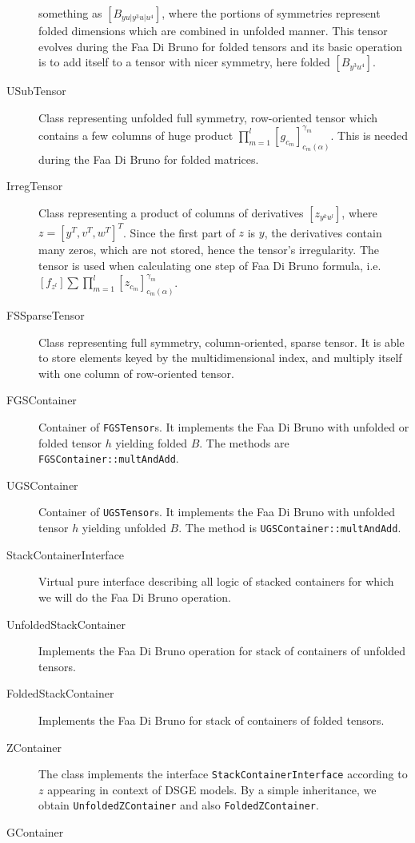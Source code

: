 \documentclass[11pt,a4paper]{article}
\begin{document}
\begin{description}
something as $\left[B_{yu\vert y^3u\vert u^4}\right]$, where the
portions of symmetries represent folded dimensions which are combined
in unfolded manner. This tensor evolves during the Faa Di Bruno
for folded tensors and its basic operation is to add itself to a
tensor with nicer symmetry, here folded $\left[B_{y^3u^4}\right]$.
\item[USubTensor] 
Class representing unfolded full symmetry, row-oriented tensor which
contains a few columns of huge product
$\prod_{m=1}^l\left[g_{c_m}\right]^{\gamma_m}_{c_m(\alpha)}$. This is
needed during the Faa Di Bruno for folded matrices.
\item[IrregTensor] 
Class representing a product of columns of derivatives
$\left[z_{y^ku^l}\right]$, where $z=[y^T,v^T,w^T]^T$. Since the first
part of $z$ is $y$, the derivatives contain many zeros, which are not
stored, hence the tensor's irregularity. The tensor is used when
calculating one step of Faa Di Bruno formula, i.e.
$\left[f_{z^l}\right]\sum\prod_{m=1}^l\left[z_{c_m}\right]^{\gamma_m}_{c_m(\alpha)}$.
\item[FSSparseTensor] 
Class representing full symmetry, column-oriented, sparse tensor. It
is able to store elements keyed by the multidimensional index, and
multiply itself with one column of row-oriented tensor.
\item[FGSContainer] 
Container of \texttt{FGSTensor}s. It implements the Faa Di Bruno with
unfolded or folded tensor $h$ yielding folded $B$. The methods are
\texttt{FGSContainer::multAndAdd}.
\item[UGSContainer] 
Container of \texttt{UGSTensor}s. It implements the Faa Di Bruno with
unfolded tensor $h$ yielding unfolded $B$. The method is
\texttt{UGSContainer::multAndAdd}.
\item[StackContainerInterface] 
Virtual pure interface describing all logic
of stacked containers for which we will do the Faa Di Bruno operation. 
\item[UnfoldedStackContainer] 
Implements the Faa Di Bruno operation for stack of
containers of unfolded tensors.
\item[FoldedStackContainer] 
Implements the Faa Di Bruno for stack of
containers of folded tensors.
\item[ZContainer] 
The class implements the interface \texttt{StackContainerInterface} according
to $z$ appearing in context of DSGE models. By a simple inheritance,
we obtain \texttt{UnfoldedZContainer} and also \texttt{FoldedZContainer}.
\item[GContainer] 

\end{description}
\end{document}
